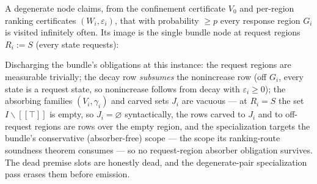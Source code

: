 \begin{brecipe}\label{rec:sd-filled}
A degenerate node claims, from the confinement certificate $V_0$ and
per-region ranking certificates $(W_i, \varepsilon_i)$, that with
probability $\ge p$ every response region $G_i$ is visited infinitely
often. Its image is the single bundle node at request regions
$R_i := S$ (every state requests):
\begin{mathpar}
\end{mathpar}
Discharging the bundle's obligations at this instance: the request
regions are measurable trivially; the decay row \emph{subsumes} the
nonincrease row (off $G_i$, every state is a request state, so
nonincrease follows from decay with $\varepsilon_i \ge 0$); the
absorbing families $(V_i, \gamma_i)$ and carved sets $J_i$ are vacuous
--- at $R_i = S$ the set $I \smallsetminus [\![\top]\!]$ is empty, so
$J_i = \varnothing$ syntactically, the rows carved to $J_i$ and to
off-request regions are rows over the empty region, and the
specialization targets the bundle's conservative (absorber-free)
scope --- the scope its ranking-route soundness theorem consumes ---
so no request-region absorber obligation survives. The dead premise slots are honestly dead, and the
degenerate-pair specialization pass erases them before emission.
\end{brecipe}

